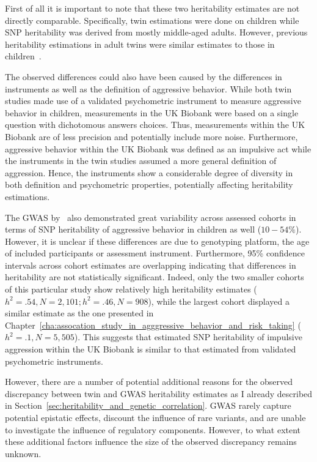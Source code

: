 First of all it is important to note that these two heritability estimates are not directly comparable.
Specifically, twin estimations were done on children while SNP heritability was derived from mostly middle-aged adults.
However, previous heritability estimations in adult twins were similar estimates to those in children~\cite{Miles1997a}.

The observed differences could also have been caused by the differences in instruments as well as the definition of aggressive behavior.
While both  twin studies made use of a validated psychometric instrument to measure aggressive behavior in children, measurements in the UK Biobank were based on a single question with dichotomous answers choices.
Thus, measurements within the UK Biobank are of less precision and potentially include more noise.
Furthermore, aggressive behavior within the UK Biobank was defined as an impulsive act while the  instruments in the twin studies assumed a more general definition of aggression.
Hence, the  instruments show a considerable degree of diversity in both definition and psychometric properties, potentially affecting heritability estimations.

The GWAS by~\citet{Pappa2016a} also demonstrated great variability across assessed cohorts in terms of SNP heritability of aggressive behavior in children as well ($10-54\%$).
However, it is unclear if these differences are due to genotyping platform, the age of included participants or assessment instrument.
Furthermore, 95\% confidence intervals across cohort estimates are overlapping indicating that differences in heritability are not statistically significant.
Indeed, only the two smaller cohorts of this particular study show relatively high heritability estimates ($h^2=.54, N=2,101; h^2=.46, N=908$), while the largest cohort displayed a similar estimate as the one presented in Chapter~\ref{cha:assocation_study_in_agggressive_behavior_and_risk_taking} ($h^2=.1, N=5,505$).
This suggests that estimated SNP heritability of impulsive aggression within the UK Biobank is similar to that estimated from validated psychometric instruments. 

However, there are a number of potential additional reasons for the observed discrepancy between twin and GWAS heritability estimates as I already described in Section~\ref{sec:heritability_and_genetic_correlation}.
GWAS rarely capture potential epistatic effects, discount the influence of rare variants, and are unable to investigate the influence of regulatory components. 
However, to what extent these additional factors influence the size of the observed discrepancy remains unknown.

